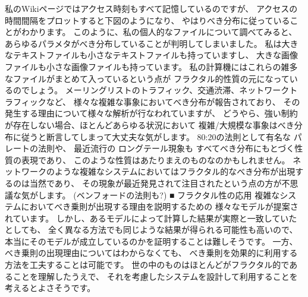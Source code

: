 私のWikiページではアクセス時刻もすべて記憶しているのですが、 アクセスの時間間隔をプロットすると下図のようになり、 やはりべき分布に従っていることがわかります。
このように、私の個人的なファイルについて調べてみると、 あらゆるパラメタがべき分布していることが判明してしまいました。
私は大きなテキストファイルも小さなテキストファイルも持っていますし、 大きな画像ファイルも小さな画像ファイルも持っています。 私の計算機にはこれらの雑多なファイルがまとめて入っているという点が フラクタル的性質の元になっているのでしょう。
メーリングリストのトラフィック、交通渋滞、ネットワークトラフィックなど、 様々な複雑な事象においてべき分布が報告されており、 その発生する理由について様々な解析が行なわれていますが、 どうやら、強い制約が存在しない場合、ほとんどあらゆる状況において 複雑/大規模な事象はべき分布に従うと断言してしまって大丈夫な気がします。 80:20の法則として有名な パレートの法則や、 最近流行の ロングテール現象も すべてべき分布にもとづく性質の表現であり、 このような性質はあたりまえのものなのかもしれません。 ネットワークのような複雑なシステムにおいてはフラクタル的なべき分布が出現するのは当然であり、 その現象が最近発見されて注目されたという点の方が不思議な気がします。
(ベンフォードの法則も?)
■ フラクタル性の応用
複雑なシステムにおいてべき乗則が出現する理由を説明するための 様々なモデルが提案されています。 しかし、あるモデルによって計算した結果が実際と一致していたとしても、 全く異なる方法でも同じような結果が得られる可能性も高いので、 本当にそのモデルが成立しているのかを証明することは難しそうです。 一方、 べき乗則の出現理由についてはわからなくても、 べき乗則を効果的に利用する方法を工夫することは可能です。 世の中のものはほとんどがフラクタル的であることを理解したうえで、 それを考慮したシステムを設計して利用することを考えるとよさそうです。


